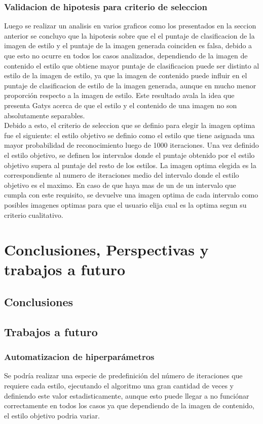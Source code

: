 \documentclass[a4paper,11pt,spanish]{book}
\begin{document}
    \subsection{Validacion de hipotesis para criterio de seleccion}
      Luego se realizar un analisis en varios graficos como los presentados en la seccion anterior se concluyo que la hipotesis sobre que el el puntaje de clasificacion de la imagen
      de estilo y el puntaje de la imagen generada coinciden es falsa, debido a que esto no ocurre en todos los casos analizados, dependiendo de la imagen de contenido el estilo
      que obtiene mayor puntaje de clasificacion puede ser distinto al estilo de la imagen de estilo, ya que la imagen de contenido puede influir en el puntaje de clasificacion de estilo
      de la imagen generada, aunque en mucho menor proporción respecto a la imagen de estilo. Este resultado avala la idea que presenta Gatys acerca de que el estilo y el contenido de una
      imagen no son absolutamente separables.\\
      Debido a esto, el criterio de seleccion que se definio para elegir la imagen optima fue el siguiente: el estilo objetivo se definio como el estilo que tiene asignada una mayor
      probabilidad de reconocimiento luego de 1000 iteraciones. Una vez definido el estilo objetivo, se definen los intervalos donde el puntaje obtenido por el estilo objetivo
      supera al puntaje del resto de los estilos. La imagen optima elegida es la correspondiente al numero de iteraciones medio del intervalo donde el estilo objetivo es el maximo. En caso de que haya mas de un de
      un intervalo que cumpla con este requisito, se devuelve una imagen optima de cada intervalo como posibles imagenes optimas para que el usuario elija cual es la optima segun su criterio
      cualitativo.


\chapter{Conclusiones, Perspectivas y trabajos a futuro}
  \section{Conclusiones}
  \section{Trabajos a futuro}
    \subsection{Automatizacion de hiperparámetros}
      Se podría realizar una especie de predefinición del número de iteraciones que requiere cada estilo, ejecutando el algoritmo una gran cantidad de veces y definiendo este valor
      estadisticamente, aunque esto puede llegar a no funciónar correctamente en todos los casos ya que dependiendo de la imagen de contenido, el estilo objetivo podria variar.
\end{document}
